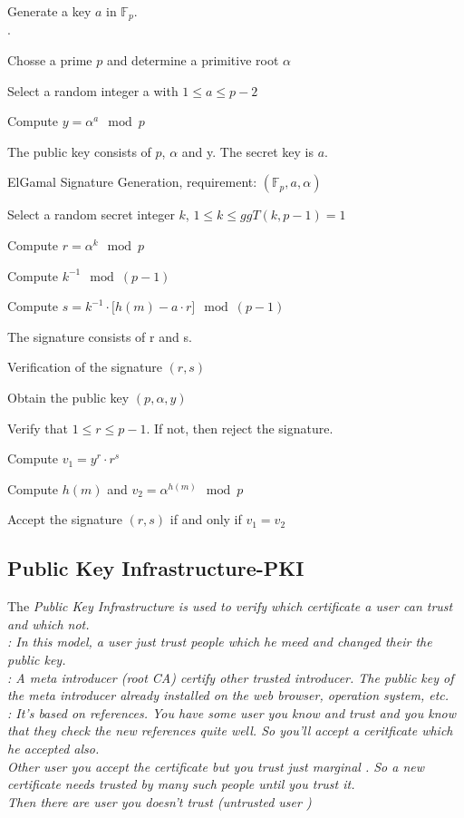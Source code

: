 Generate a key $a$ in $\mathbb{F}_p$.\\.
\begin{aufzaehlung}
\item Chosse a prime $p$ and determine a primitive root $\alpha$
\item Select a random integer a with $1 \leq a \leq p-2$
\item Compute $y=\alpha^a \mod p$
\item The public key consists of $p$, $\alpha$ and y. The secret key is $a$.
\end{aufzaehlung}

ElGamal Signature Generation, requirement: $(\mathbb{F}_p, a, \alpha)$
\begin{aufzaehlung}
  	\item  Select a random secret integer $k$, $1 \leq k \leq ggT(k,p-1)=1$ 
  	\item  Compute $r=\alpha^k \mod p$ 
  	\item  Compute $k^{-1} \mod (p-1)$
  	\item  Compute $s=k^{-1} \cdot \lbrack h(m) - a \cdot r \rbrack \mod (p-1)$
  	\item  The signature consists of r and s.
\end{aufzaehlung}

Verification of the signature $(r,s)$
\begin{aufzaehlung}
  \item   Obtain the public key $(p,\alpha,y)$
  \item   Verify that $1 \leq r \leq p-1$. If not, then reject the signature.
  \item   Compute $v_1=y^r \cdot r^s$
  \item   Compute $h(m)$ and $v_2=\alpha^{h(m)} \mod p$
  \item   Accept the signature $(r,s)$ if and only if $v_1=v_2$
\end{aufzaehlung}

\subsection{Public Key Infrastructure-PKI}
The \em Public Key Infrastructure \em is used to verify which certificate a user can trust and which not.\\
: 
In this model, a user just trust people which he meed and changed their the public key. \\
: A \em meta introducer \em (root CA) certify other trusted introducer. The public key of the meta introducer 
already installed on the web browser, operation system, etc. \\
: It's based on references. You have some user you know and \em trust \em and you know that 
they check the new references quite well. So you'll accept a ceritficate which he accepted also.\\
Other user you accept the certificate but you trust just \em marginal \em. So a new certificate needs trusted by many such people until you trust it.\\
Then there are user you doesn't trust (\em untrusted user \em)

